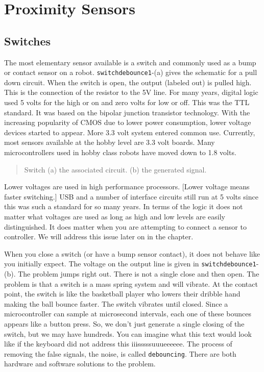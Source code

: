 \hypertarget{proximity-sensors}{%
\section{Proximity Sensors}\label{proximity-sensors}}

\hypertarget{switches}{%
\subsection{Switches}\label{switches}}

The most elementary sensor available is a switch and commonly used as a
bump or contact sensor on a robot. \texttt{switchdebounce1}-(a) gives
the schematic for a pull down circuit. When the switch is open, the
output (labeled out) is pulled high. This is the connection of the
resistor to the 5V line. For many years, digital logic used 5 volts for
the high or on and zero volts for low or off. This was the TTL standard.
It was based on the bipolar junction transistor technology. With the
increasing popularity of CMOS due to lower power consumption, lower
voltage devices started to appear. More 3.3 volt system entered common
use. Currently, most sensors available at the hobby level are 3.3 volt
boards. Many microcontrollers used in hobby class robots have moved down
to 1.8 volts.

\begin{quote}
Switch (a) the associated circuit. (b) the generated signal.
\end{quote}

Lower voltages are used in high performance processors. {[}Lower voltage
means faster switching.{]} USB and a number of interface circuits still
run at 5 volts since this was such a standard for so many years. In
terms of the logic it does not matter what voltages are used as long as
high and low levels are easily distinguished. It does matter when you
are attempting to connect a sensor to controller. We will address this
issue later on in the chapter.

When you close a switch (or have a bump sensor contact), it does not
behave like you initially expect. The voltage on the output line is
given in \texttt{switchdebounce1}-(b). The problem jumps right out.
There is not a single close and then open. The problem is that a switch
is a mass spring system and will vibrate. At the contact point, the
switch is like the basketball player who lowers their dribble hand
making the ball bounce faster. The switch vibrates until closed. Since a
microcontroller can sample at microsecond intervals, each one of these
bounces appears like a button press. So, we don't just generate a single
closing of the switch, but we may have hundreds. You can imagine what
this text would look like if the keyboard did not address this
iiisssssuuueeeeee. The process of removing the false signals, the noise,
is called \texttt{debouncing}. There are both hardware and software
solutions to the problem.

